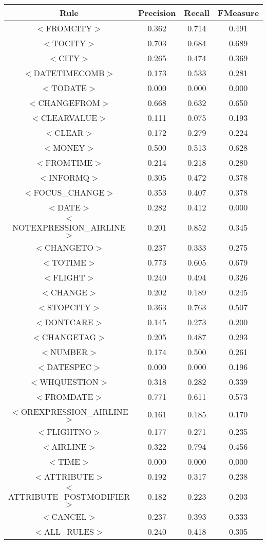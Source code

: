 \documentclass[a4paper,10pt]{article}
\begin{document}
\pagebreak
{} \label{tab:title} 
\begin{center}
\begin{tabular}{|c||c|c|c|}
\hline
Rule&Precision&Recall&FMeasure\\
\hline
\hline
$<$FROMCITY$>$&0.362&0.714&0.491 \\
\hline$<$TOCITY$>$&0.703&0.684&0.689 \\
\hline$<$CITY$>$&0.265&0.474&0.369 \\
\hline$<$DATETIMECOMB$>$&0.173&0.533&0.281 \\
\hline$<$TODATE$>$&0.000&0.000&0.000 \\
\hline$<$CHANGEFROM$>$&0.668&0.632&0.650 \\
\hline$<$CLEARVALUE$>$&0.111&0.075&0.193 \\
\hline$<$CLEAR$>$&0.172&0.279&0.224 \\
\hline$<$MONEY$>$&0.500&0.513&0.628 \\
\hline$<$FROMTIME$>$&0.214&0.218&0.280 \\
\hline$<$INFORMQ$>$&0.305&0.472&0.378 \\
\hline$<$FOCUS\_CHANGE$>$&0.353&0.407&0.378 \\
\hline$<$DATE$>$&0.282&0.412&0.000 \\
\hline$<$NOTEXPRESSION\_AIRLINE$>$&0.201&0.852&0.345 \\
\hline$<$CHANGETO$>$&0.237&0.333&0.275 \\
\hline$<$TOTIME$>$&0.773&0.605&0.679 \\
\hline$<$FLIGHT$>$&0.240&0.494&0.326 \\
\hline$<$CHANGE$>$&0.202&0.189&0.245 \\
\hline$<$STOPCITY$>$&0.363&0.763&0.507 \\
\hline$<$DONTCARE$>$&0.145&0.273&0.200 \\
\hline$<$CHANGETAG$>$&0.205&0.487&0.293 \\
\hline$<$NUMBER$>$&0.174&0.500&0.261 \\
\hline$<$DATESPEC$>$&0.000&0.000&0.196 \\
\hline$<$WHQUESTION$>$&0.318&0.282&0.339 \\
\hline$<$FROMDATE$>$&0.771&0.611&0.573 \\
\hline$<$OREXPRESSION\_AIRLINE$>$&0.161&0.185&0.170 \\
\hline$<$FLIGHTNO$>$&0.177&0.271&0.235 \\
\hline$<$AIRLINE$>$&0.322&0.794&0.456 \\
\hline$<$TIME$>$&0.000&0.000&0.000 \\
\hline$<$ATTRIBUTE$>$&0.192&0.317&0.238 \\
\hline$<$ATTRIBUTE\_POSTMODIFIER$>$&0.182&0.223&0.203 \\
\hline$<$CANCEL$>$&0.237&0.393&0.333 \\
\hline
\hline
$<$ALL\_RULES$>$&0.240&0.418&0.305 \\
\hline
\end{tabular}
\end{center}
\end{document}

